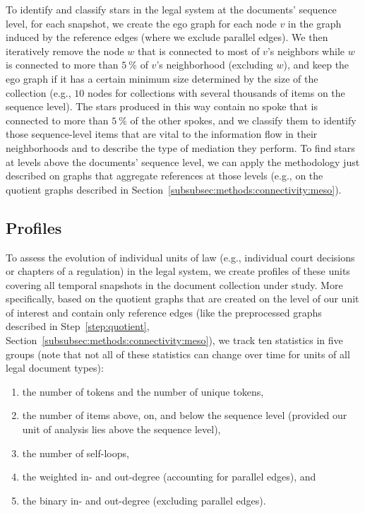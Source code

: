 \documentclass[utf8,sort&compress,table,hidelinks]{frontiersFPHY} %
\begin{document}
To identify and classify stars in the legal system at the documents' sequence level,
for each snapshot, we create the ego graph for each node $v$ in the graph induced by the reference edges (where we exclude parallel edges). 
We then iteratively remove the node $w$ that is connected to most of $v$'s neighbors while $w$ is connected to more than $5~\%$ of $v$'s neighborhood (excluding $w$), and keep the ego graph if it has a certain minimum size determined by the size of the collection (e.g., $10$ nodes for collections with several thousands of items on the sequence level).
The stars produced in this way contain no spoke that is connected to more than $5~\%$ of the other spokes, and we classify them to identify those sequence-level items that are vital to the information flow in their neighborhoods and to describe the type of mediation they perform.
To find stars at levels above the documents' sequence level, we can apply the methodology just described on graphs that aggregate references at those levels (e.g., on the quotient graphs described in Section~\ref{subsubsec:methods:connectivity:meso}).

\vspace*{12pt}
\subsection{Profiles}
\label{subsec:methods:profiles}

To assess the evolution of individual units of law (e.g., individual court decisions or chapters of a regulation) in the legal system, we create profiles of these units covering all temporal snapshots in the document collection under study.
More specifically, based on the quotient graphs that are created on the level of our unit of interest and contain only reference edges (like the preprocessed graphs described in Step~\ref{step:quotient}, Section~\ref{subsubsec:methods:connectivity:meso}), 
we track ten statistics in five groups (note that not all of these statistics can change over time for units of all legal document types):
\begin{enumerate}
	\item the number of tokens and the number of unique tokens,
	\item the number of items above, on, and below the sequence level (provided our unit of analysis lies above the sequence level),
	\item the number of self-loops,
	\item the weighted in- and out-degree (accounting for parallel edges), and
	\item the binary in- and out-degree (excluding parallel edges).
\end{enumerate} 
\end{document}
